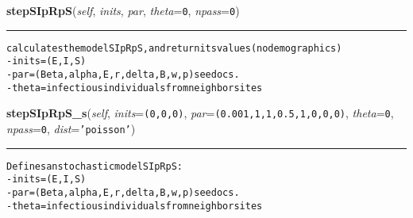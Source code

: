     \vspace{0.5ex}

    \begin{boxedminipage}{\textwidth}

    \raggedright \textbf{stepSIpRpS}(\textit{self}, \textit{inits}, \textit{par}, \textit{theta}=\texttt{0}, \textit{npass}=\texttt{0})

    \vspace{-1.5ex}

    \rule{\textwidth}{0.5\fboxrule}
\begin{alltt}

calculates the model SIpRpS, and return its values (no demographics)
- inits = (E,I,S)
- par = (Beta, alpha, E,r,delta,B, w, p) see docs.
- theta = infectious individuals from neighbor sites
\end{alltt}

    \vspace{1ex}

    \end{boxedminipage}

    \label{Epigrass:simobj:popmodels:stepSIpRpS_s}

    \vspace{0.5ex}

    \begin{boxedminipage}{\textwidth}

    \raggedright \textbf{stepSIpRpS\_s}(\textit{self}, \textit{inits}=\texttt{(0,0,0)}, \textit{par}=\texttt{(0.001,1,1,0.5,1,0,0,0)}, \textit{theta}=\texttt{0}, \textit{npass}=\texttt{0}, \textit{dist}=\texttt{'poisson'})

    \vspace{-1.5ex}

    \rule{\textwidth}{0.5\fboxrule}
\begin{alltt}

Defines an stochastic model SIpRpS:
- inits = (E,I,S)
- par = (Beta, alpha, E,r,delta,B,w,p) see docs.
- theta = infectious individuals from neighbor sites
\end{alltt}

    \vspace{1ex}

    \end{boxedminipage}

    \label{Epigrass:simobj:popmodels:stepSEIpRpS}

